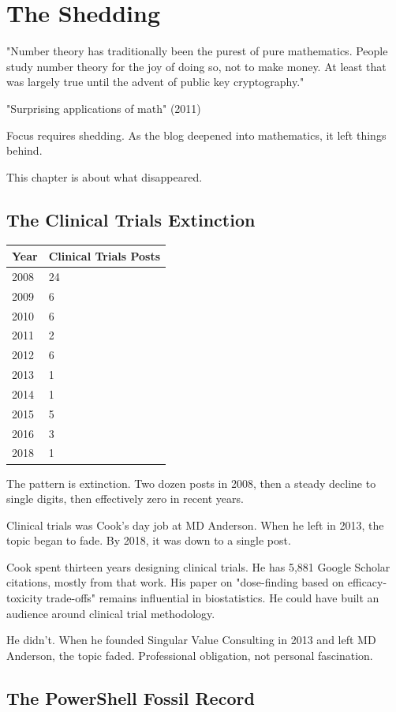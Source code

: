 \chapter{The Shedding}

\epigraph{"Number theory has traditionally been the purest of pure mathematics. People study number theory for the joy of doing so, not to make money. At least that was largely true until the advent of public key cryptography."}{"Surprising applications of math" (2011)}

Focus requires shedding. As the blog deepened into mathematics, it left things behind.

This chapter is about what disappeared.

\bigskip

\section*{The Clinical Trials Extinction}

\begin{longtable}{l p{6.5cm}}
\toprule
\textbf{Year} & \textbf{Clinical Trials Posts} \tabularnewline
\midrule
2008 & 24 \tabularnewline
2009 & 6 \tabularnewline
2010 & 6 \tabularnewline
2011 & 2 \tabularnewline
2012 & 6 \tabularnewline
2013 & 1 \tabularnewline
2014 & 1 \tabularnewline
2015 & 5 \tabularnewline
2016 & 3 \tabularnewline
2018 & 1 \tabularnewline
\bottomrule
\end{longtable}

The pattern is extinction. Two dozen posts in 2008, then a steady decline to single digits, then effectively zero in recent years.

Clinical trials was Cook's day job at MD Anderson. When he left in 2013, the topic began to fade. By 2018, it was down to a single post.

Cook spent thirteen years designing clinical trials. He has 5,881 Google Scholar citations, mostly from that work. His paper on "dose-finding based on efficacy-toxicity trade-offs" remains influential in biostatistics. He could have built an audience around clinical trial methodology.

He didn't. When he founded Singular Value Consulting in 2013 and left MD Anderson, the topic faded. Professional obligation, not personal fascination.

\bigskip

\section*{The PowerShell Fossil Record}

